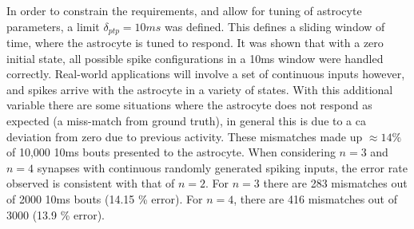 \documentclass[conference]{IEEEtran}
\newcommand{\ca}{\gls{ca}\textrm{ }}
\newcommand{\eq}[1]{Equation (\ref{#1})}
\begin{document}
In order to constrain the requirements, and allow for tuning of astrocyte
parameters, a limit $\delta_{ptp}=10ms$ was defined. This defines a sliding
window of time, where the astrocyte is tuned to respond. It was shown that with a
zero initial state, all possible spike configurations in a 10ms window were
handled correctly. Real-world applications will involve a set of continuous
inputs however, and spikes arrive with the astrocyte in a variety of
states. With this additional variable there are some situations where the
astrocyte does not respond as expected (a miss-match from ground truth), in
general this is due to a \ca deviation from zero due to previous activity. These
mismatches made up $\approx 14\%$ of 10,000 10ms bouts presented to the
astrocyte. When considering $n=3$ and $n=4$ synapses with continuous randomly
generated spiking inputs, the error rate observed is consistent with that of
$n=2$. For $n=3$ there are 283 mismatches out of 2000 10ms bouts (14.15 \%
error). For $n=4$, there are 416 mismatches out of 3000 (13.9 \% error).



\end{document}
